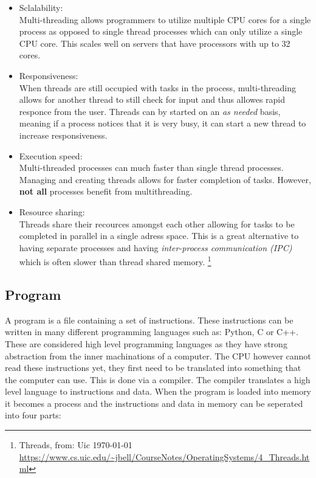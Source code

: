 \begin{itemize}
\item Sclalability: \\

Multi-threading allows programmers to utilize multiple CPU cores for a single process as opposed to single
thread processes which can only utilize a single CPU core. This scales well on servers that have processors
with up to 32 cores.

\item Responsiveness: \\

When threads are still occupied with tasks in the process, multi-threading allows for another thread
to still check for input and thus allowes rapid responce from the user. Threads can by started on an
		\textit{as needed} basis, meaning if a process notices that it is very busy, it can start
		a new thread to increase responsiveness.

\item Execution speed: \\

Multi-threaded processes can much faster than single thread processes. Managing and creating threads allows for
		faster completion of tasks. However, \textbf{not all} processes benefit from multithreading. 

\item Resource sharing: \\

Threads share their recources amongst each other allowing for tasks to be completed in parallel in a
		single adress space. This is a great alternative to having separate processes and having \textit{inter-process communication (IPC)}
		which is often slower than thread shared memory.
		\footnote{Threads, from: Uic \today \\ \url{https://www.cs.uic.edu/~jbell/CourseNotes/OperatingSystems/4_Threads.html} }

\end{itemize}

\subsection{Program}

A program is a file containing a set of instructions. These instructions can be written in many different 
programming languages such as: Python, C or C++. These are considered high level programming languages as 
they have strong abstraction from the inner machinations of a computer. The CPU however cannot read these 
instructions yet, they first need to be translated into something that the computer can use. This is done 
via a compiler. The compiler translates a high level language to instructions and data. When the program is
loaded into memory it becomes a process and the instructions and data in memory can be seperated into four parts:

